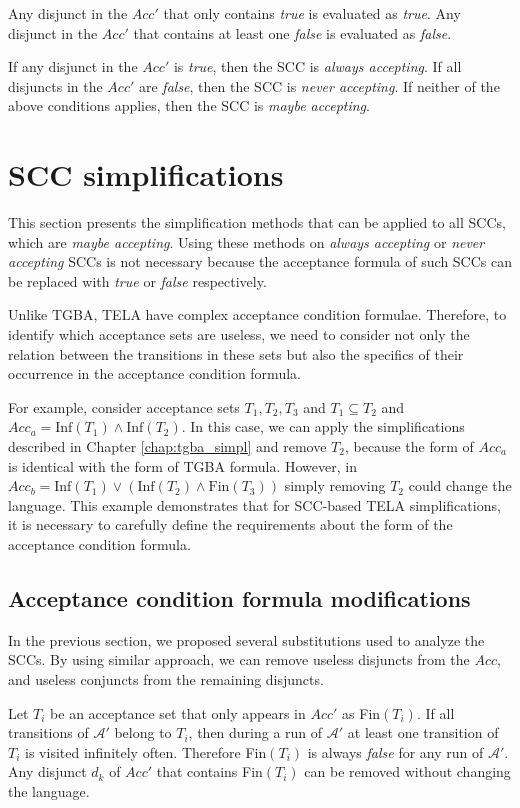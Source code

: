 \documentclass[
  digital, %
  twoside, %
  table,   %
  lof,     %
  lot,     %
]{fithesis3}
\begin{document}
Any disjunct in the $Acc'$ that only contains \emph{true} is evaluated as \emph{true}. Any disjunct in the $Acc'$ that contains at least one \emph{false} is evaluated as \emph{false}. 

If any disjunct in the $Acc'$ is \emph{true}, then the SCC is \emph{always accepting}. If all disjuncts in the $Acc'$ are \emph{false}, then the SCC is \emph{never accepting}. If neither of the above conditions applies, then the SCC is \emph{maybe accepting}.

\section{SCC simplifications}
This section presents the simplification methods that can be applied to all SCCs, which are \emph{maybe accepting}. Using these methods on \emph{always accepting} or \emph{never accepting} SCCs is not necessary because the acceptance formula of such SCCs can be replaced with \emph{true} or \emph{false} respectively. 

Unlike TGBA, TELA have complex acceptance condition formulae. Therefore, to identify which acceptance sets are useless, we need to consider not only the relation between the transitions in these sets but also the specifics of their occurrence in the acceptance condition formula. 

For example, consider acceptance sets $T_1, T_2, T_3$ and $T_1 \subseteq T_2$ and $Acc_a = \text{Inf}(T_1) \wedge \text{Inf}(T_2)$. In this case, we can apply the simplifications described in Chapter \ref{chap:tgba_simpl} and remove $T_2$, because the form of $Acc_a$ is identical with the form of TGBA formula. However, in $Acc_b = \text{Inf}(T_1) \vee (\text{Inf}(T_2) \wedge \text{Fin}(T_3))$ simply removing $T_2$ could change the language. This example demonstrates that for SCC-based TELA simplifications, it is necessary to carefully define the requirements about the form of the acceptance condition formula.

\subsection{Acceptance condition formula modifications}
In the previous section, we proposed several substitutions used to analyze the SCCs. By using similar approach, we can remove useless disjuncts from the $Acc$, and useless conjuncts from the remaining disjuncts.

Let $T_i$ be an acceptance set that only appears in $Acc'$ as Fin$(T_i)$. If all transitions of $\mathcal{A'}$ belong to $T_i$, then during a run of $\mathcal{A'}$ at least one transition of $T_i$ is visited infinitely often. Therefore Fin$(T_i)$ is always \emph{false} for any run of $\mathcal{A'}$. Any disjunct $d_k$ of $Acc'$ that contains Fin$(T_i)$ can be removed without changing the language.
\end{document}
